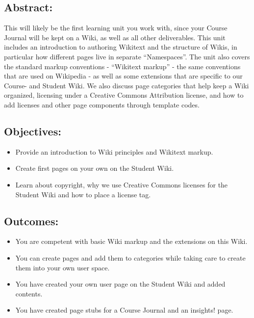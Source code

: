 \documentclass[]{book}
\providecommand{\tightlist}{%
  \setlength{\itemsep}{0pt}\setlength{\parskip}{0pt}}
\begin{document}
\subsection{Abstract:}\label{abstract}

This will likely be the first learning unit you work with, since your
Course Journal will be kept on a Wiki, as well as all other
deliverables. This unit includes an introduction to authoring Wikitext
and the structure of Wikis, in particular how different pages live in
separate ``Namespaces''. The unit also covers the standard markup
conventions - ``Wikitext markup'' - the same conventions that are used
on Wikipedia - as well as some extensions that are specific to our
Course- and Student Wiki. We also discuss page categories that help keep
a Wiki organized, licensing under a Creative Commons Attribution
license, and how to add licenses and other page components through
template codes.

\subsection{Objectives:}\label{objectives}

\begin{itemize}
\tightlist
\item
  Provide an introduction to Wiki principles and Wikitext markup.
\item
  Create first pages on your own on the Student Wiki.
\item
  Learn about copyright, why we use Creative Commons licenses for the
  Student Wiki and how to place a license tag.
\end{itemize}

\subsection{Outcomes:}\label{outcomes}

\begin{itemize}
\tightlist
\item
  You are competent with basic Wiki markup and the extensions on this
  Wiki.
\item
  You can create pages and add them to categories while taking care to
  create them into your own user space.
\item
  You have created your own user page on the Student Wiki and added
  contents.
\item
  You have created page stubs for a Course Journal and an insights!
  page.
\end{itemize}
\end{document}
